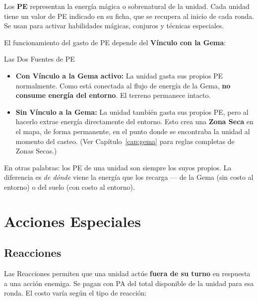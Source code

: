 Los \textbf{PE} representan la energía mágica o sobrenatural de la unidad. Cada unidad tiene un valor de PE indicado en su ficha, que se recupera al inicio de cada ronda. Se usan para activar habilidades mágicas, conjuros y técnicas especiales.

El funcionamiento del gasto de PE depende del \textbf{Vínculo con la Gema}:

\begin{reglaespecial}{Las Dos Fuentes de PE}
\begin{itemize}
    \item \textbf{Con Vínculo a la Gema activo:} La unidad gasta sus propios PE normalmente. Como está conectada al flujo de energía de la Gema, \textbf{no consume energía del entorno}. El terreno permanece intacto.

    \item \textbf{Sin Vínculo a la Gema:} La unidad también gasta sus propios PE, pero al hacerlo extrae energía directamente del entorno. Esto crea una \textbf{Zona Seca} en el mapa, de forma permanente, en el punto donde se encontraba la unidad al momento del casteo. (Ver Capítulo~\ref{cap:gema} para reglas completas de Zonas Secas.)
\end{itemize}
\end{reglaespecial}

En otras palabras: los PE de una unidad son siempre los suyos propios. La diferencia es \textit{de dónde} viene la energía que los recarga — de la Gema (sin costo al entorno) o del suelo (con costo al entorno).

\section{Acciones Especiales}

\subsection*{Reacciones}

Las Reacciones permiten que una unidad actúe \textbf{fuera de su turno} en respuesta a una acción enemiga. Se pagan con PA del total disponible de la unidad para esa ronda. El costo varía según el tipo de reacción:

